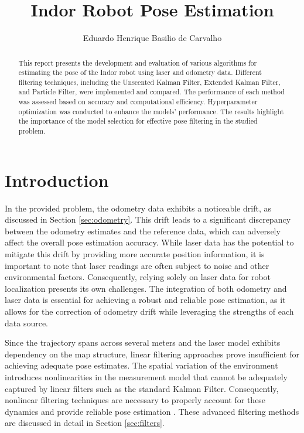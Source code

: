 \documentclass[conference]{IEEEtran}
\begin{document}
\title{
    Indor Robot Pose Estimation
}

\author{
    Eduardo Henrique Basilio de Carvalho
}

\maketitle

\begin{abstract}
    This report presents the development and evaluation of various algorithms for estimating the pose of the Indor robot using laser and odometry data. Different filtering techniques, including the Unscented Kalman Filter, Extended Kalman Filter, and Particle Filter, were implemented and compared. The performance of each method was assessed based on accuracy and computational efficiency. Hyperparameter optimization was conducted to enhance the models' performance. The results highlight the importance of the model selection for effective pose filtering in the studied problem.
\end{abstract}

\section{Introduction} \label{sec:introduction}

In the provided problem, the odometry data exhibits a noticeable drift, as discussed in Section \ref{sec:odometry}. This drift leads to a significant discrepancy between the odometry estimates and the reference data, which can adversely affect the overall pose estimation accuracy. While laser data has the potential to mitigate this drift by providing more accurate position information, it is important to note that laser readings are often subject to noise and other environmental factors. Consequently, relying solely on laser data for robot localization presents its own challenges. The integration of both odometry and laser data is essential for achieving a robust and reliable pose estimation, as it allows for the correction of odometry drift while leveraging the strengths of each data source.

Since the trajectory spans across several meters and the laser model exhibits dependency on the map structure, linear filtering approaches prove insufficient for achieving adequate pose estimates. The spatial variation of the environment introduces nonlinearities in the measurement model that cannot be adequately captured by linear filters such as the standard Kalman Filter. Consequently, nonlinear filtering techniques are necessary to properly account for these dynamics and provide reliable pose estimation \cite{Aguirre2007}. These advanced filtering methods are discussed in detail in Section \ref{sec:filters}.
\end{document}
